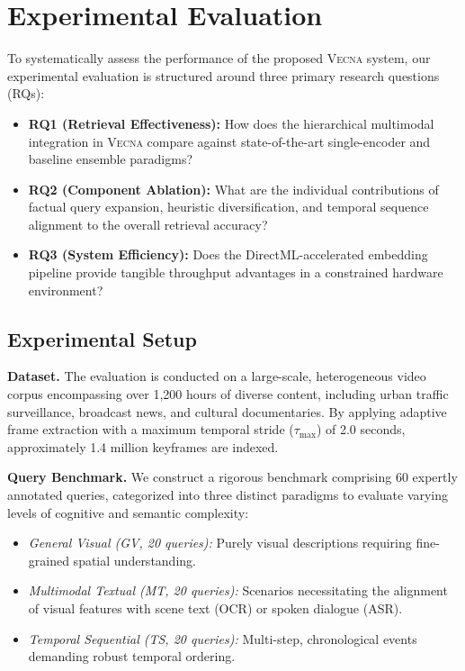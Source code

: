 \section{Experimental Evaluation}\label{sec:exp}

To systematically assess the performance of the proposed \textsc{Vecna} system, our experimental evaluation is structured around three primary research questions (RQs):
\begin{itemize}
    \item \textbf{RQ1 (Retrieval Effectiveness):} How does the hierarchical multimodal integration in \textsc{Vecna} compare against state-of-the-art single-encoder and baseline ensemble paradigms?
    \item \textbf{RQ2 (Component Ablation):} What are the individual contributions of factual query expansion, heuristic diversification, and temporal sequence alignment to the overall retrieval accuracy?
    \item \textbf{RQ3 (System Efficiency):} Does the DirectML-accelerated embedding pipeline provide tangible throughput advantages in a constrained hardware environment?
\end{itemize}

\subsection{Experimental Setup}

\textbf{Dataset.} The evaluation is conducted on a large-scale, heterogeneous video corpus encompassing over 1,200 hours of diverse content, including urban traffic surveillance, broadcast news, and cultural documentaries. By applying adaptive frame extraction with a maximum temporal stride ($\tau_{\max}$) of 2.0 seconds, approximately 1.4 million keyframes are indexed.

\textbf{Query Benchmark.} We construct a rigorous benchmark comprising 60 expertly annotated queries, categorized into three distinct paradigms to evaluate varying levels of cognitive and semantic complexity:
\begin{itemize}
    \item \textit{General Visual (GV, 20 queries):} Purely visual descriptions requiring fine-grained spatial understanding.
    \item \textit{Multimodal Textual (MT, 20 queries):} Scenarios necessitating the alignment of visual features with scene text (OCR) or spoken dialogue (ASR).
    \item \textit{Temporal Sequential (TS, 20 queries):} Multi-step, chronological events demanding robust temporal ordering.
\end{itemize}


